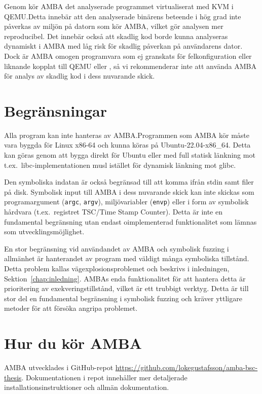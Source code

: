 Genom \stoe{} kör AMBA det analyserade programmet virtualiserat med KVM i
QEMU.\@ Detta innebär att den analyserade binärens beteende i hög grad inte
påverkas av miljön på datorn som kör AMBA, vilket gör analysen mer
reproducibel. Det innebär också att skadlig kod borde kunna analyseras dynamiskt
i AMBA med låg risk för skadlig påverkan på användarens dator. Dock är AMBA
omogen programvara som ej granskats för felkonfiguration eller liknande kopplat
till QEMU eller \stoe{}, så vi rekommenderar inte att använda AMBA för analys av
skadlig kod i dess nuvarande skick.

\section{Begränsningar}

Alla program kan inte hanteras av AMBA.\@ Programmen som AMBA kör måste vara
byggda för Linux x86-64 och kunna köras på Ubuntu-22.04-x86\_64. Detta kan göras
genom att bygga direkt för Ubuntu eller med full statisk länkning mot t.ex.\
libc-implementationen musl istället för dynamisk länkning mot glibc.

Den symboliska indatan är också begränsad till att komma ifrån stdin samt filer
på disk. Symbolisk input till AMBA i dess nuvarande skick kan inte skickas som
programargument (\verb|argc|, \verb|argv|), miljövariabler (\verb|envp|) eller i
form av symbolisk hårdvara (t.ex.\ registret TSC/Time Stamp Counter). Detta är
inte en fundamental begränsning utan endast oimplementerad funktionalitet som
lämnas som utvecklingsmöjlighet.

En stor begränsning vid användandet av AMBA och symbolisk fuzzing i
allmänhet är hanterandet av program med väldigt många symboliska tillstånd.
Detta problem kallas vägexplosionsproblemet och beskrivs i inledningen,
Sektion~\ref{chap:inledning}. AMBAs enda funktionalitet för att hantera detta är
prioritering av exekveringstillstånd, vilket är ett trubbigt verktyg. Detta är
till stor del en fundamental begränsning i symbolisk fuzzing och kräver
yttligare metoder för att försöka angripa problemet.

\section{Hur du kör AMBA}\label{sec:run-amba}

AMBA utvecklades i GitHub-repot
\url{https://github.com/lokegustafsson/amba-bsc-thesis}. Dokumentationen i repot
innehåller mer detaljerade installationsinstruktioner och allmän dokumentation.

